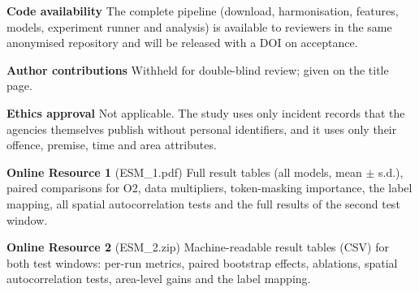 \documentclass[11pt]{article}
\begin{document}
\noindent\textbf{Code availability} The complete pipeline (download, harmonisation, features, models, experiment runner and analysis) is available to reviewers in the same anonymised repository and will be released with a DOI on acceptance.

\noindent\textbf{Author contributions} Withheld for double-blind review; given on the title page.

\noindent\textbf{Ethics approval} Not applicable. The study uses only incident records that the agencies themselves publish without personal identifiers, and it uses only their offence, premise, time and area attributes.

\noindent\textbf{Online Resource 1} (ESM\_1.pdf) Full result tables (all models, mean $\pm$ s.d.), paired comparisons for O2, data multipliers, token-masking importance, the label mapping, all spatial autocorrelation tests and the full results of the second test window.

\noindent\textbf{Online Resource 2} (ESM\_2.zip) Machine-readable result tables (CSV) for both test windows: per-run metrics, paired bootstrap effects, ablations, spatial autocorrelation tests, area-level gains and the label mapping.



\end{document}
